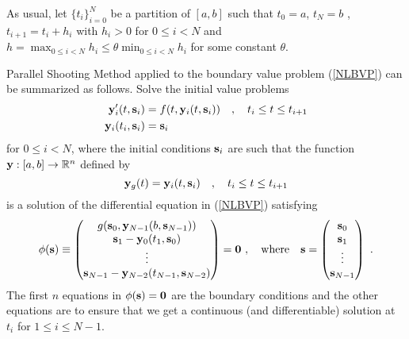 As usual, let $\{t_i\}_{i=0}^N$ be a partition of $[a,b]$ such that
$t_0 = a$, $t_N = b$ , $t_{i+1} = t_i + h_i$ with $h_i > 0$
for $0\leq i < N$ and
$\displaystyle h = \max_{0\leq i < N} h_i \leq \theta \min_{0\leq i < N} h_i$
for some constant $\theta$.

Parallel Shooting Method applied to the boundary value problem
(\ref{NLBVP}) can be summarized as follows.  Solve the initial value
problems
\begin{align*}
\mathbf{y}_i'(t, \mathbf{s}_i) &= f(t,\mathbf{y}_i(t,\mathbf{s}_i))
\quad , \quad t_i \leq t \leq t_{i+1} \\
\mathbf{y}_i(t_i,\mathbf{s}_i) &= \mathbf{s}_i
\end{align*}
for $0\leq i < N$, where the initial conditions $\mathbf{s}_i$ are
such that the function $\mathbf{y}:[a,b]\to \mathbb{R}^n$ defined by
\[
\mathbf{y}_g(t)= \mathbf{y}_i(t,\mathbf{s}_i) \quad , \quad t_i \leq t \leq t_{i+1}
\]
is a solution of the differential equation in (\ref{NLBVP}) satisfying
\[
\phi(\VEC{s}) \equiv \begin{pmatrix}
g(\VEC{s}_0,\VEC{y}_{N-1}(b,\VEC{s}_{N-1})) \\
\VEC{s}_1 - \VEC{y}_0(t_1,\VEC{s}_0) \\
\vdots \\
\VEC{s}_{N-1} - \VEC{y}_{N-2}(t_{N-1},\VEC{s}_{N-2})
\end{pmatrix}
= \VEC{0} \ , \quad \text{where} \quad 
\VEC{s} = \begin{pmatrix}
\VEC{s}_0 \\ \VEC{s}_1 \\ \vdots \\ \VEC{s}_{N-1} \end{pmatrix} \ .
\]
The first $n$ equations in $\phi(\mathbf{s}) = \mathbf{0}$ are the boundary
conditions and the other equations are to ensure that we get a
continuous (and differentiable) solution at $t_i$ for $1\leq i \leq N-1$.

